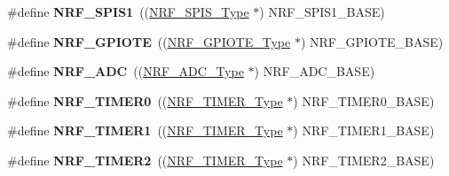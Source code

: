 \begin{DoxyCompactItemize}
\item 
\hypertarget{group___device___peripheral___registers_ga8e7a98d2cf2f543d972446a1d2121bb8}{}\#define {\bfseries N\+R\+F\+\_\+\+S\+P\+I\+S1}~((\hyperlink{struct_n_r_f___s_p_i_s___type}{N\+R\+F\+\_\+\+S\+P\+I\+S\+\_\+\+Type}           $\ast$) N\+R\+F\+\_\+\+S\+P\+I\+S1\+\_\+\+B\+A\+S\+E)\label{group___device___peripheral___registers_ga8e7a98d2cf2f543d972446a1d2121bb8}

\item 
\hypertarget{group___device___peripheral___registers_ga97274a7bf5c3fa3f7f4c381a34872cbf}{}\#define {\bfseries N\+R\+F\+\_\+\+G\+P\+I\+O\+T\+E}~((\hyperlink{struct_n_r_f___g_p_i_o_t_e___type}{N\+R\+F\+\_\+\+G\+P\+I\+O\+T\+E\+\_\+\+Type}         $\ast$) N\+R\+F\+\_\+\+G\+P\+I\+O\+T\+E\+\_\+\+B\+A\+S\+E)\label{group___device___peripheral___registers_ga97274a7bf5c3fa3f7f4c381a34872cbf}

\item 
\hypertarget{group___device___peripheral___registers_gab95a3a715e0bec620f77e920ea932717}{}\#define {\bfseries N\+R\+F\+\_\+\+A\+D\+C}~((\hyperlink{struct_n_r_f___a_d_c___type}{N\+R\+F\+\_\+\+A\+D\+C\+\_\+\+Type}            $\ast$) N\+R\+F\+\_\+\+A\+D\+C\+\_\+\+B\+A\+S\+E)\label{group___device___peripheral___registers_gab95a3a715e0bec620f77e920ea932717}

\item 
\hypertarget{group___device___peripheral___registers_ga5a5e16c2da9a0a51fe775904ddb6555c}{}\#define {\bfseries N\+R\+F\+\_\+\+T\+I\+M\+E\+R0}~((\hyperlink{struct_n_r_f___t_i_m_e_r___type}{N\+R\+F\+\_\+\+T\+I\+M\+E\+R\+\_\+\+Type}          $\ast$) N\+R\+F\+\_\+\+T\+I\+M\+E\+R0\+\_\+\+B\+A\+S\+E)\label{group___device___peripheral___registers_ga5a5e16c2da9a0a51fe775904ddb6555c}

\item 
\hypertarget{group___device___peripheral___registers_gabefb3b14edc49a1b29b7bf06634d4063}{}\#define {\bfseries N\+R\+F\+\_\+\+T\+I\+M\+E\+R1}~((\hyperlink{struct_n_r_f___t_i_m_e_r___type}{N\+R\+F\+\_\+\+T\+I\+M\+E\+R\+\_\+\+Type}          $\ast$) N\+R\+F\+\_\+\+T\+I\+M\+E\+R1\+\_\+\+B\+A\+S\+E)\label{group___device___peripheral___registers_gabefb3b14edc49a1b29b7bf06634d4063}

\item 
\hypertarget{group___device___peripheral___registers_ga7dab3275bcec8e68283113083159cb0a}{}\#define {\bfseries N\+R\+F\+\_\+\+T\+I\+M\+E\+R2}~((\hyperlink{struct_n_r_f___t_i_m_e_r___type}{N\+R\+F\+\_\+\+T\+I\+M\+E\+R\+\_\+\+Type}          $\ast$) N\+R\+F\+\_\+\+T\+I\+M\+E\+R2\+\_\+\+B\+A\+S\+E)\label{group___device___peripheral___registers_ga7dab3275bcec8e68283113083159cb0a}


\end{DoxyCompactItemize}
